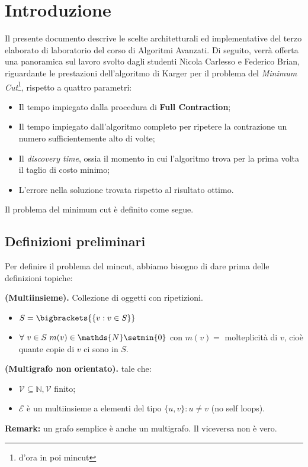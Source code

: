 \section{Introduzione}
Il presente documento descrive le scelte architetturali ed implementative del terzo elaborato di laboratorio del corso di Algoritmi Avanzati. Di seguito, verrà offerta una panoramica sul lavoro svolto dagli studenti Nicola Carlesso e Federico Brian, riguardante le prestazioni dell'algoritmo di Karger per il problema del \emph{Minimum Cut}\footnote{d'ora in poi mincut}, rispetto a quattro parametri:
\begin{itemize}
	\item Il tempo impiegato dalla procedura di \textbf{Full Contraction};
	\item Il tempo impiegato dall'algoritmo completo per ripetere la contrazione un numero sufficientemente alto di volte;
	\item Il \emph{discovery time}, ossia il momento in cui l'algoritmo trova per la prima volta il taglio di costo minimo;
	\item L'errore  nella soluzione trovata rispetto al risultato ottimo.
\end{itemize}
Il problema del minimum cut è definito come segue.

\subsection{Definizioni preliminari}
Per definire il problema del mincut, abbiamo bisogno di dare prima delle definizioni topiche:
\begin{defi} \textbf{(Multiinsieme).} Collezione di oggetti con ripetizioni.
\begin{itemize}
	\item $S = \bigbrackets{\{v: v\in S\}}$
	\item $\forall\ v\in S\ m(v)\in\mathds{N}\setmin \{0\}$ con $m(v) = $ molteplicità di $v$, cioè quante copie di $v$ ci sono in $S$.
\end{itemize}
\end{defi}
\begin{defi} \textbf{(Multigrafo non orientato).} \mgrafo tale che:
\begin{itemize}
	\item $\mathcal{V}\subseteq\mathds{N}, \mathcal{V}$ finito;
	\item $\mathcal{E}$ è un multiinsieme a elementi del tipo $\{u,v\} : u\neq v$ (no self loops).
\end{itemize}
\end{defi}
\textbf{Remark:} un grafo semplice \grafo è anche un multigrafo. Il viceversa non è vero.

